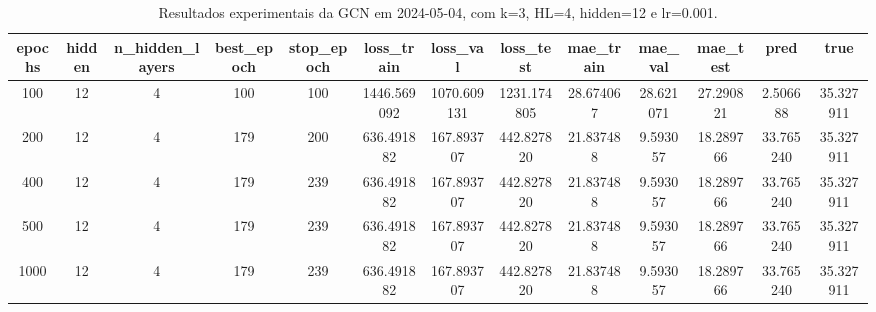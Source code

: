 \begin{table}[h]
\centering
\caption{Resultados experimentais da GCN em 2024-05-04, com k=3, HL=4, hidden=12 e lr=0.001.}
\label{tab:gcn_results_k3_hl4_h12_d20240504}
\begin{tabular}{ccccccccccccc}
\toprule
epochs & hidden & n\_hidden\_layers & best\_epoch & stop\_epoch & loss\_train & loss\_val & loss\_test & mae\_train & mae\_val & mae\_test & pred & true \\
\midrule
100 & 12 & 4 & 100 & 100 & 1446.569092 & 1070.609131 & 1231.174805 & 28.674067 & 28.621071 & 27.290821 & 2.506688 & 35.327911 \\
200 & 12 & 4 & 179 & 200 & 636.491882 & 167.893707 & 442.827820 & 21.837488 & 9.593057 & 18.289766 & 33.765240 & 35.327911 \\
400 & 12 & 4 & 179 & 239 & 636.491882 & 167.893707 & 442.827820 & 21.837488 & 9.593057 & 18.289766 & 33.765240 & 35.327911 \\
500 & 12 & 4 & 179 & 239 & 636.491882 & 167.893707 & 442.827820 & 21.837488 & 9.593057 & 18.289766 & 33.765240 & 35.327911 \\
1000 & 12 & 4 & 179 & 239 & 636.491882 & 167.893707 & 442.827820 & 21.837488 & 9.593057 & 18.289766 & 33.765240 & 35.327911 \\
\bottomrule
\end{tabular}
\end{table}
